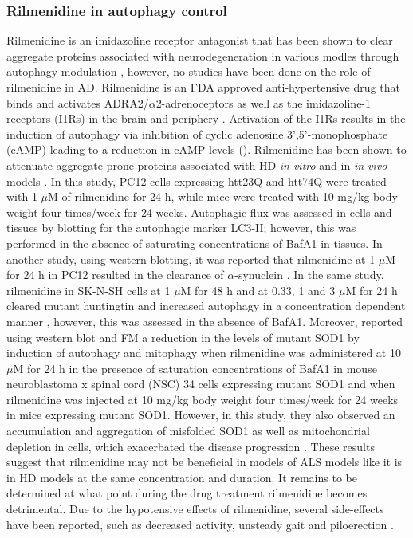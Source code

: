 \subsubsection{Rilmenidine in autophagy control}
Rilmenidine is an imidazoline receptor antagonist that has been shown to clear aggregate proteins associated with neurodegeneration in various modles through autophagy modulation \citep{Rose2010,Williams2008,Perera2018}, however, no studies have been done on the role of rilmenidine in AD. Rilmenidine is an FDA approved anti-hypertensive drug that binds and activates ADRA2/$\alpha$2-adrenoceptors as well as the imidazoline-1 receptors (I1Rs) in the brain and periphery \citep{Rose2010}. Activation of the I1Rs results in the induction of autophagy via inhibition of cyclic adenosine 3',5'-monophosphate (cAMP) leading to a reduction in cAMP levels \citep{Williams2008} (). Rilmenidine has been shown to attenuate aggregate-prone proteins associated with HD \textit{in vitro} and in \textit{in vivo} models \citep{Rose2010}. In this study, PC12 cells expressing htt23Q and htt74Q were treated with 1 $\mu$M of rilmenidine for 24 h, while mice were treated with 10 mg/kg body weight four times/week for 24 weeks\citep{Rose2010}. Autophagic flux was assessed in cells and tissues by blotting for the autophagic marker LC3-II; however, this was performed in the absence of saturating concentrations of BafA1 in tissues. In another study, using western blotting, it was reported that rilmenidine at 1 $\mu$M for 24 h in PC12 resulted in the clearance of $\alpha$-synuclein \citep{Williams2008}. In the same study, rilmenidine in SK-N-SH cells at 1 $\mu$M for 48 h and at 0.33, 1 and 3 $\mu$M for 24 h cleared mutant huntingtin and increased autophagy in a concentration dependent manner \citep{Williams2008}, however, this was assessed in the absence of BafA1. Moreover,  \citet{Perera2018} reported using western blot and FM a reduction in the levels of mutant SOD1 by induction of autophagy and mitophagy when rilmenidine was administered at 10 $\mu$M for 24 h in the presence of saturation concentrations of BafA1 in mouse neuroblastoma x spinal cord (NSC) 34 cells expressing mutant SOD1 and when rilmenidine was injected at 10 mg/kg body weight four times/week for 24 weeks in mice expressing mutant SOD1. However, in this study, they also observed an accumulation and aggregation of misfolded SOD1 as well as mitochondrial depletion in cells, which exacerbated the disease progression \citep{Perera2018}. These results suggest that rilmenidine may not be beneficial in models of ALS models like it is in HD models at the same concentration and duration. It remains to be determined at what point during the drug treatment rilmenidine becomes detrimental. Due to the hypotensive effects of rilmenidine, several side-effects have been reported, such as decreased activity, unsteady gait and piloerection \citep{Rose2010}.
 
